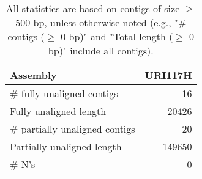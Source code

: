 \documentclass[12pt,a4paper]{article}
\begin{document}
\begin{table}[ht]
\begin{center}
\caption{All statistics are based on contigs of size $\geq$ 500 bp, unless otherwise noted (e.g., "\# contigs ($\geq$ 0 bp)" and "Total length ($\geq$ 0 bp)" include all contigs).}
\begin{tabular}{|l*{1}{|r}|}
\hline
Assembly & URI117H \\ \hline
\# fully unaligned contigs & 16 \\ \hline
Fully unaligned length & 20426 \\ \hline
\# partially unaligned contigs & 20 \\ \hline
Partially unaligned length & 149650 \\ \hline
\# N's & 0 \\ \hline
\end{tabular}
\end{center}
\end{table}
\end{document}
